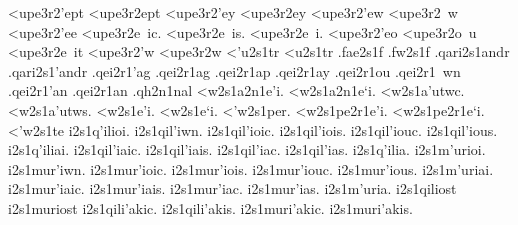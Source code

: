 {	<upe3r2'ept 		%
	<upe3r2ept
	<upe3r2'ey
	<upe3r2ey
	<upe3r2'ew 		%
	<upe3r2~w
	<upe3r2'ee
	<upe3r2e~ic.
	<upe3r2e~is.
	<upe3r2e~i.
	<upe3r2'eo
	<upe3r2o~u
	<upe3r2e~it
	<upe3r2'w 		%
	<upe3r2w 		%
<'u2s1tr 		%
<u2s1tr 		%
.fae2s1f 		%
.fw2s1f  		%
.qari2s1andr 		%
.qari2s1'andr
.qei2r1'ag 		%
.qei2r1ag  		%
.qei2r1ap  		%
.qei2r1ay		%
.qei2r1ou  		%
.qei2r1~wn 		%
.qei2r1'an
.qei2r1an
.qh2n1nal		%
<w2s1a2n1e'i. 		%
<w2s1a2n1e`i.
<w2s1a'utwc.  		%
<w2s1a'utws.
<w2s1e'i.  		%
<w2s1e`i.
<'w2s1per.		%
<w2s1pe2r1e'i. 		%
<w2s1pe2r1e`i.
<'w2s1te  		%
i2s1q'ilioi.  		%
i2s1qil'iwn.
i2s1qil'ioic.
i2s1qil'iois.
i2s1qil'iouc.
i2s1qil'ious.
i2s1q'iliai.
i2s1qil'iaic.
i2s1qil'iais.
i2s1qil'iac.
i2s1qil'ias.
i2s1q'ilia.
%
i2s1m'urioi. 		%
i2s1mur'iwn.
i2s1mur'ioic.
i2s1mur'iois.
i2s1mur'iouc.
i2s1mur'ious.
i2s1m'uriai.
i2s1mur'iaic.
i2s1mur'iais.
i2s1mur'iac.
i2s1mur'ias.
i2s1m'uria.
%
i2s1qiliost  		%
%
i2s1muriost 		%
%
i2s1qili'akic. 		%
i2s1qili'akis.
%
i2s1muri'akic. 		%
i2s1muri'akis.
} %
\endgroup
\endinput
